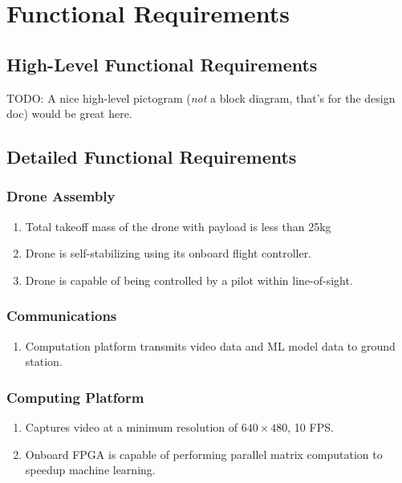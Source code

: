 \documentclass[10pt,letterpaper]{article}
\begin{document}
\section{Functional Requirements}\label{section:goal}

\subsection{High-Level Functional Requirements}\label{section:about:highlevel}

TODO: A nice high-level pictogram (\textit{not} a block diagram, that's for the design doc) would be great here.

\subsection{Detailed Functional Requirements}\label{section:about:highlevel}

\subsubsection{Drone Assembly}
\begin{enumerate}[{F.DR}.1:]
	\item Total takeoff mass of the drone with payload is less than 25kg
	\item Drone is self-stabilizing using its onboard flight controller.
	\item Drone is capable of being controlled by a pilot within line-of-sight.

\end{enumerate}

\subsubsection{Communications}
\begin{enumerate}[{F.CM}.1:]
	\item Computation platform transmits video data and ML model data to ground station.
\end{enumerate}

\subsubsection{Computing Platform}
\begin{enumerate}[{F.CP}.1:]
	\item Captures video at a minimum resolution of $640\times 480$, 10 FPS.
	\item Onboard FPGA is capable of performing parallel matrix computation to speedup machine learning.
\end{enumerate}
\end{document}
